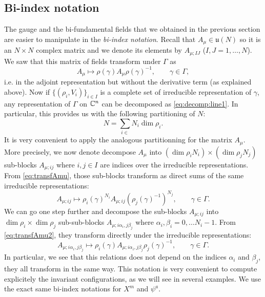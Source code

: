     \subsection{Bi-index notation}

        The gauge and the bi-fundamental fields that we obtained in the previous section are easier to manipulate in the \emph{bi-index notation}. Recall that $A_\mu\in\mathfrak{u}(N)$ so it is an $N\times N$ complex matrix and we denote its elements by $A_{\mu;IJ}$ ($I,J=1,\dots,N$). We saw that this matrix of fields transform under $\Gamma$ as
        \begin{equation}
            A_\mu\mapsto \rho(\gamma)A_\mu \rho(\gamma)^{-1},\qquad \gamma\in \Gamma,\label{eq:transfAmu1}
        \end{equation}
        i.e. in the adjoint representation but without the derivative term (as explained above). Now if $\{(\rho_i,V_i)\}_{i\in I}$ is a complete set of irreducible representation of $\gamma$, any representation of $\Gamma$ on $\mathbb{C}^n$ can be decomposed as \eqref{eq:decomp:line1}. In particular, this provides us with the following partitioning of $N$:
        \begin{equation}
            N=\sum_{i\in}N_i\dim\rho_i.
        \end{equation}
        It is very convenient to apply the analogous partitionning for the matrix $A_\mu$. More precisely, we now denote decompose $A_\mu$ into $(\dim\rho_iN_i)\times(\dim\rho_jN_j)$ sub-blocks $A_{\mu;ij}$ where $i,j\in I$ are indices over the irreducible representations. From \eqref{eq:transfAmu}, those sub-blocks transform as direct sums of the same irreducible representations:
        \begin{equation}
            A_{\mu;ij}\mapsto \rho_i(\gamma)^{N_i}A_{\mu;ij}(\rho_j(\gamma)^{-1})^{N_j},\qquad \gamma\in\Gamma.\label{eq:transfAmu2}
        \end{equation}
        We can go one step further and decompose the sub-blocks $A_{\mu;ij}$ into $\dim\rho_i\times\dim\rho_j$ sub-sub-blocks $A_{\mu;i\alpha_i,j\beta_j}$ where $\alpha_i,\beta_i=0,\dots N_i-1$. From \eqref{eq:transfAmu2}, they transform directly under the irreducible representations:
        \begin{equation}
            \boxed{A_{\mu;i\alpha_i,j\beta_j}\mapsto\rho_i(\gamma)A_{\mu;i\alpha_i,j\beta_j}\rho_j(\gamma)^{-1},\qquad \gamma\in\Gamma.}
        \end{equation}
        In particular, we see that this relations does not depend on the indices $\alpha_i$ and $\beta_j$, they all transform in the same way. This notation is very convenient to compute explicitely the invariant configurations, as we will see in several examples. We use the exact same bi-index notations for $X^m$ and $\psi^a$.

